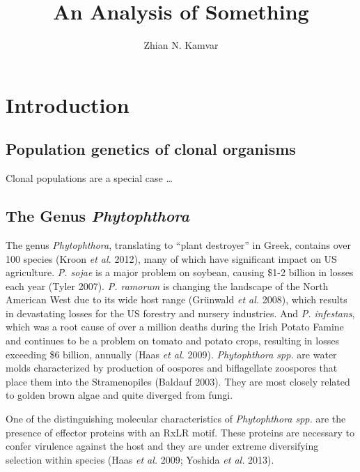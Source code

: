 \documentclass[double,12pt]{beavtex}
\title{An Analysis of Something} %
\author{Zhian N. Kamvar} %
\begin{document}
\maketitle
\mainmatter


  \chapter{Introduction}\label{introduction}
  
  \section{Population genetics of clonal
  organisms}\label{population-genetics-of-clonal-organisms}
  
  Clonal populations are a special case \ldots{}
  
  \section{\texorpdfstring{The Genus
  \emph{Phytophthora}}{The Genus Phytophthora}}\label{the-genus-phytophthora}
  
  The genus \emph{Phytophthora}, translating to ``plant destroyer'' in
  Greek, contains over 100 species (Kroon \emph{et al.} 2012), many of
  which have significant impact on US agriculture. \emph{P. sojae} is a
  major problem on soybean, causing \$1-2 billion in losses each year
  (Tyler 2007). \emph{P. ramorum} is changing the landscape of the North
  American West due to its wide host range (Grünwald \emph{et al.} 2008),
  which results in devastating losses for the US forestry and nursery
  industries. And \emph{P. infestans}, which was a root cause of over a
  million deaths during the Irish Potato Famine and continues to be a
  problem on tomato and potato crops, resulting in losses exceeding \$6
  billion, annually (Haas \emph{et al.} 2009). \emph{Phytophthora spp.}
  are water molds characterized by production of oospores and biflagellate
  zoospores that place them into the Stramenopiles (Baldauf 2003). They
  are most closely related to golden brown algae and quite diverged from
  fungi.
  
  One of the distinguishing molecular characteristics of
  \emph{Phytophthora spp.} are the presence of effector proteins with an
  RxLR motif. These proteins are necessary to confer virulence against the
  host and they are under extreme diversifying selection within species
  (Haas \emph{et al.} 2009; Yoshida \emph{et al.} 2013).
  
\end{document}
